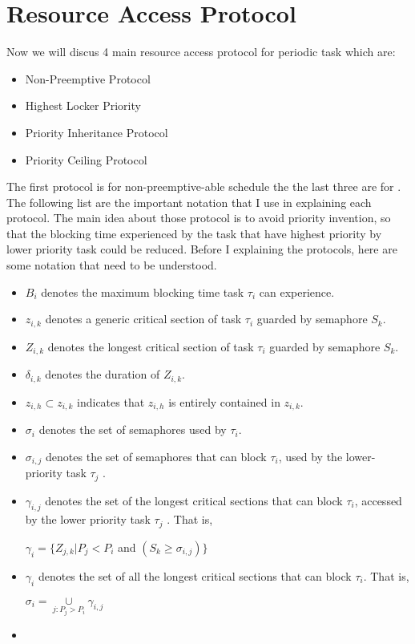 \section{Resource Access Protocol}

Now we will discus 4 main resource access protocol for periodic task which are:

\begin{itemize}
\item Non-Preemptive Protocol
\item Highest Locker Priority
\item Priority Inheritance Protocol
\item Priority Ceiling Protocol
\end{itemize}


The first protocol is for non-preemptive-able schedule the the last three are for . The following list are the important notation that I use in explaining each protocol. The main idea about those protocol is to avoid priority invention, so that the blocking time experienced by the task that have highest priority by lower priority task could be reduced. Before I explaining the protocols, here are some notation that need to be understood.

\begin{itemize}
\item $ B_{i} $ denotes the maximum blocking time task $ \tau_{i} $ can experience.
\item $ z_{i,k} $ denotes a generic critical section of task $ \tau_{i} $ guarded by semaphore $ S_{k} $.
\item  $ Z_{i,k} $ denotes the longest critical section of task $ \tau_{i} $ guarded by semaphore $ S_{k} $.
\item $ \delta_{i,k} $ denotes the duration of $ Z_{i,k} $.
\item $ z_{i,h} \subset z_{i,k} $ indicates that $ z_{i,h} $ is entirely contained in $ z_{i,k} $.
\item $ \sigma_{i} $ denotes the set of semaphores used by $ \tau_{i} $.
\item $ \sigma_{i,j} $ denotes the set of semaphores that can block $ \tau_{i} $, used by the lower-priority task $ \tau_{j} $ .
\item $ \gamma_{i,j} $ denotes the set of the longest critical sections that can block $ \tau_{i} $, accessed by the lower priority task $ \tau_{j} $ . That is,
\begin{center}
$ \gamma_{i}=\{Z_{j,k} | P_{j}<P_{i}$ and $(S_{k}\geq \sigma_{i,j}) \} $
\end{center}
\item $ \gamma_{i}$ denotes the set of all the longest critical sections that can block $ \tau_{i} $. That is,
\begin{center}
$ \sigma_{i} =\underset{j:P_{j}>P_{i}}{\cup} \gamma_{i,j}$
\end{center}
\item
\end{itemize}







